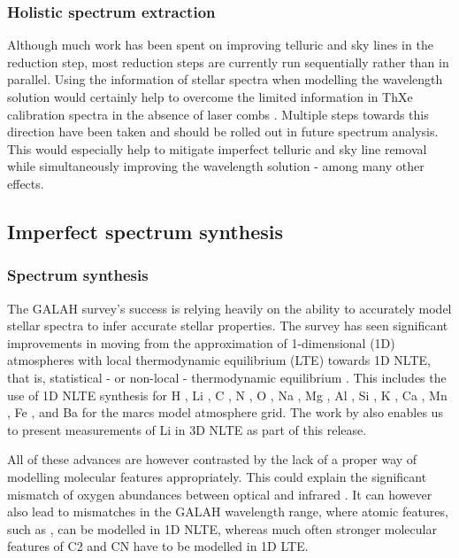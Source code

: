 \documentclass[
  journal=pasa,
  manuscript=research-paper, %
  year=2023,
  volume=37
]{cup-journal}
\newcommand\ion[2]{\text{#1\,\textsc{\lowercase{#2}}}}	%
\begin{document}
\subsubsection{Holistic spectrum extraction}

Although much work has been spent on improving telluric and sky lines in the reduction step, most reduction steps are currently run sequentially rather than in parallel. Using the information of stellar spectra when modelling the wavelength solution would certainly help to overcome the limited information in ThXe calibration spectra in the absence of laser combs \citep{Kos2018b}. Multiple steps towards this direction have been taken \citep{Saydjari2023} and should be rolled out in future spectrum analysis. This would especially help to mitigate imperfect telluric and sky line removal while simultaneously improving the wavelength solution - among many other effects.

\subsection{Imperfect spectrum synthesis} \label{sec:caveats_synthesis}

\subsubsection{Spectrum synthesis}

The GALAH survey's success is relying heavily on the ability to accurately model stellar spectra to infer accurate stellar properties. The survey has seen significant improvements in moving from the approximation of 1-dimensional (1D) atmospheres with local thermodynamic equilibrium (LTE) towards 1D NLTE, that is, statistical - or non-local - thermodynamic equilibrium \citep{Amarsi2020}. This includes the use of 1D NLTE synthesis for H \citep{Amarsi2018}, Li \citep{Lind2009, Wang2020}, C \citep{Amarsi2019}, N \citep{Amarsi2020b}, O \citep{Amarsi2018b}, Na \citep{Lind2011}, Mg \citep{Osorio2015}, Al \citep{Nordlander2017}, Si \citep{Amarsi2017}, K \citep{Reggiani2019}, Ca \citep{Osorio2019}, Mn \citep{Bergemann2019b}, Fe \citep{Amarsi2018, Amarsi2022}, and Ba \citep{Gallagher2020} for the {\sc marcs} model atmosphere grid. The work by \citet{Wang2024} also enables us to present measurements of Li in 3D NLTE as part of this release.

All of these advances are however contrasted by the lack of a proper way of modelling molecular features appropriately. This could explain the significant mismatch of oxygen abundances between optical and infrared \citep[compare e.g.][]{Bensby2014, SDSSDR17}. It can however also lead to mismatches in the GALAH wavelength range, where atomic features, such as \ion{C}{I}, can be modelled in 1D NLTE, whereas much often stronger molecular features of C2 and CN have to be modelled in 1D LTE.
\end{document}
